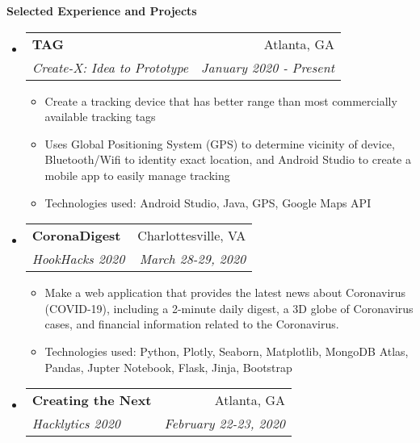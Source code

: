 \documentclass[letterpaper,11pt]{article}
\makeatletter
\newcommand{\resitem}[1]{\item #1 \vspace{-2pt}}
\newcommand{\resheading}[1]{{\large \colorbox{mygrey}{\begin{minipage}{\textwidth}{\textbf{#1 \vphantom{p\^{E}}}}\end{minipage}}}}
\newcommand{\ressubheading}[4]{
\begin{tabular*}{7.0in}{l@{\extracolsep{\fill}}r}
		\textbf{#1} & #2 \\
		\textit{#3} & \textit{#4} \\
\end{tabular*}\vspace{-6pt}}
\makeatother
\begin{document}
\resheading{Selected Experience and Projects}


\begin{itemize}
\item
    \ressubheading{TAG}{Atlanta, GA}{Create-X: Idea to Prototype}{January 2020 - Present}
    \begin{itemize}
        \item Create a tracking device that has better range than most commercially available tracking tags
        \item Uses Global Positioning System (GPS) to determine vicinity of device, Bluetooth/Wifi to identity exact location, and Android Studio to create a mobile app to easily manage tracking
        \item Technologies used: Android Studio, Java, GPS, Google Maps API
    \end{itemize}
\item
    \ressubheading{CoronaDigest}{Charlottesville, VA}{HookHacks 2020}{March 28-29, 2020}
    \begin{itemize}
        \resitem{Make a web application that provides the latest news about Coronavirus (COVID-19), including a 2-minute daily digest, a 3D globe of Coronavirus cases, and financial information related to the Coronavirus.}
        \resitem{Technologies used: Python, Plotly, Seaborn, Matplotlib, MongoDB Atlas, Pandas, Jupter Notebook, Flask, Jinja, Bootstrap}
    \end{itemize}
\item
    \ressubheading{Creating the Next}{Atlanta, GA}{Hacklytics 2020}{February 22-23, 2020}

\end{itemize}
\end{document}
